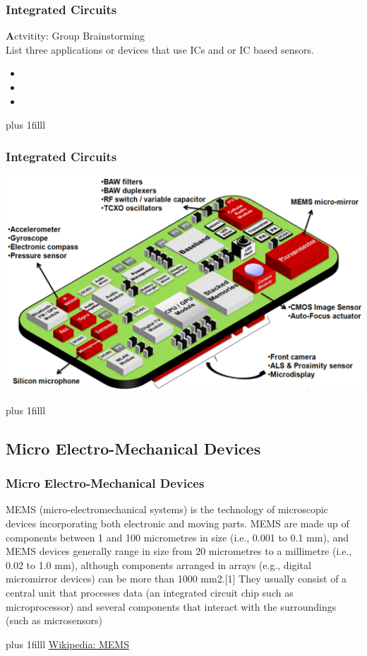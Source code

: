 \documentclass[fleqn]{beamer} %
\newcommand{\sectionIIsubsectionItitle}{Integrated Circuits}
\newcommand{\sectionIIsubsectionIItitle}{Micro Electro-Mechanical Devices}
\newcommand{\btVFill}{\vskip0pt plus 1filll}
\begin{document}
			\begin{frame}[label=sectionIIsubsectionI]
				\frametitle{\sectionIIsubsectionItitle}	

				{\textbf Actvitity:} Group Brainstorming \\
				List three applications or devices that use ICs and or IC based sensors.
				\begin{itemize}
					\item
					\item
					\item
				\end{itemize}


				\btVFill	

			\end{frame}

		    \begin{frame}[label=sectionIIsubsectionI]
				\frametitle{\sectionIIsubsectionItitle}

				\includegraphics[scale=0.45]{images/Mobile_Device_Sensors.png}
	
				\btVFill	
		
			\end{frame}	

		\subsection{\sectionIIsubsectionIItitle}\label{sectionIIsubsectionII}

			\begin{frame}
				\frametitle{\sectionIIsubsectionIItitle}
				
				MEMS (micro-electromechanical systems) is the technology of microscopic devices incorporating both electronic and moving parts. MEMS are made up of components between 1 and 100 micrometres in size (i.e., 0.001 to 0.1 mm), and MEMS devices generally range in size from 20 micrometres to a millimetre (i.e., 0.02 to 1.0 mm), although components arranged in arrays (e.g., digital micromirror devices) can be more than 1000 mm2.[1] They usually consist of a central unit that processes data (an integrated circuit chip such as microprocessor) and several components that interact with the surroundings (such as microsensors)
			
				\btVFill
				{\tiny \href{https://en.wikipedia.org/wiki/MEMS}{Wikipedia: MEMS}}

			\end{frame}
\end{document}
